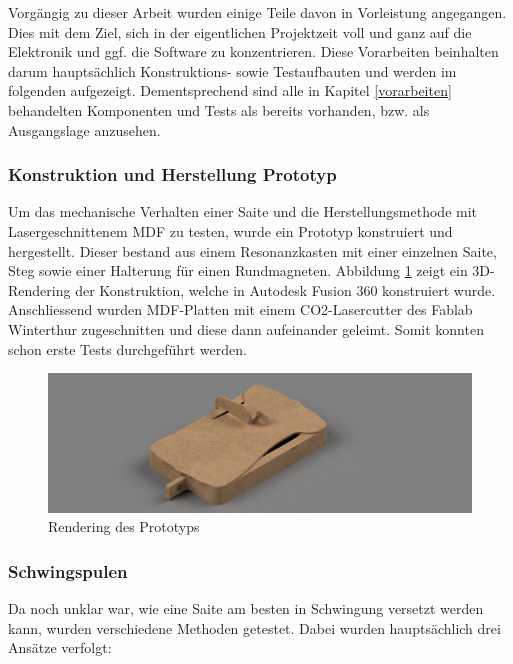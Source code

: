 Vorgängig zu dieser Arbeit wurden einige Teile davon in Vorleistung angegangen. Dies mit dem Ziel, sich in der eigentlichen Projektzeit voll und ganz auf die Elektronik und ggf. die Software zu konzentrieren. Diese Vorarbeiten beinhalten darum hauptsächlich Konstruktions- sowie Testaufbauten und werden im folgenden aufgezeigt. Dementsprechend sind alle in Kapitel \ref{vorarbeiten} behandelten Komponenten und Tests als bereits vorhanden, bzw. als Ausgangslage anzusehen.
\subsubsection{Konstruktion und Herstellung Prototyp}
Um das mechanische Verhalten einer Saite und die Herstellungsmethode mit Lasergeschnittenem MDF zu testen, wurde ein Prototyp konstruiert und hergestellt. Dieser bestand aus einem Resonanzkasten mit einer einzelnen Saite, Steg sowie einer Halterung für einen Rundmagneten. Abbildung \ref{pics:prototype} zeigt ein 3D-Rendering der Konstruktion, welche in Autodesk Fusion 360 konstruiert wurde. Anschliessend wurden MDF-Platten mit einem CO2-Lasercutter des Fablab Winterthur zugeschnitten und diese dann aufeinander geleimt. Somit konnten schon erste Tests durchgeführt werden.
\begin{figure}[H]
	\centering
	\includegraphics[width=\textwidth]{pictures/render_prototype.PNG}
	\caption{Rendering des Prototyps}
	\label{pics:prototype}
\end{figure}
\subsubsection{Schwingspulen}
Da noch unklar war, wie eine Saite am besten in Schwingung versetzt werden kann, wurden verschiedene Methoden getestet. Dabei wurden hauptsächlich drei Ansätze verfolgt:
